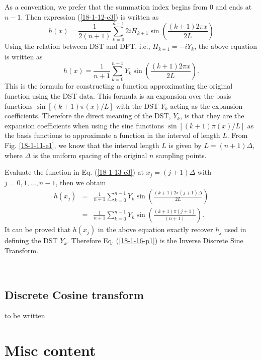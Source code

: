 \documentclass{article}
\begin{document}
As a convention, we prefer that the summation index begins from 0 and ends at
$n - 1$. Then expression (\ref{18-1-12-e3}) is written as
\[ h (x) = \frac{1}{2 (n + 1)} \sum_{k = 0}^{n - 1} 2 i H_{k + 1} \sin \left(
   \frac{(k + 1) 2 \pi x}{2 L} \right) \]
Using the relation between DST and DFT, i.e., $H_{k + 1} = - i Y_k$, the above
equation is written as
\begin{equation}
  \label{18-1-13-e3} h (x) = \frac{1}{n + 1} \sum_{k = 0}^{n - 1} Y_k \sin
  \left( \frac{(k + 1) 2 \pi x}{2 L} \right) .
\end{equation}
This is the formula for constructing a function approximating the original
function using the DST data. This formula is an expansion over the basis
functions $\sin [(k + 1) \pi (x) / L]$ with the DST $Y_k$ acting as the
expansion coefficients. Therefore the direct meaning of the DST, $Y_k$, is
that they are the expansion coefficients when using the sine functions $\sin
[(k + 1) \pi (x) / L]$ as the basis functions to approximate a function in the
interval of length $L$. From Fig. \ref{18-1-11-e1}, we know that the interval
length $L$ is given by $L = (n + 1) \Delta$, where $\Delta$ is the uniform
spacing of the original $n$ sampling points.

Evaluate the function in Eq. (\ref{18-1-13-e3}) at $x_j = (j + 1) \Delta$ with
$j = 0, 1, \ldots, n - 1$, then we obtain
\begin{eqnarray}
  h (x_j) & = & \frac{1}{n + 1} \sum_{k = 0}^{n - 1} Y_k \sin \left( \frac{(k
  + 1) 2 \pi (j + 1) \Delta}{2 L} \right) \nonumber\\
  & = & \frac{1}{n + 1} \sum_{k = 0}^{n - 1} Y_k \sin \left( \frac{(k + 1)
  \pi (j + 1)}{(n + 1)} \right) .  \label{18-1-16-p1}
\end{eqnarray}
It can be proved that $h (x_j)$ in the above equation exactly recover $h_j$
used in defining the DST $Y_k$. Therefore Eq. (\ref{18-1-16-p1}) is the
Inverse Discrete Sine Transform.

\

\subsection{Discrete Cosine transform}

to be written

\section{Misc content}
\end{document}
